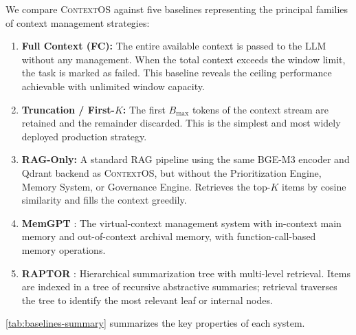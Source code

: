 \documentclass[review,12pt]{elsarticle}
\newcommand{\contextos}{\textsc{ContextOS}}
\begin{document}
We compare \contextos{} against five baselines representing the principal
families of context management strategies:

\begin{enumerate}[label=\textbf{B\arabic*.}, leftmargin=3em]
  \item \textbf{Full Context (FC):}  The entire available context is passed to
  the LLM without any management.  When the total context exceeds the window
  limit, the task is marked as failed.  This baseline reveals the ceiling
  performance achievable with unlimited window capacity.

  \item \textbf{Truncation / First-$K$:}  The first $B_{\max}$ tokens of the
  context stream are retained and the remainder discarded.  This is the
  simplest and most widely deployed production strategy.

  \item \textbf{RAG-Only:}  A standard RAG pipeline using the same BGE-M3
  encoder and Qdrant backend as \contextos{}, but without the Prioritization
  Engine, Memory System, or Governance Engine.  Retrieves the top-$K$ items
  by cosine similarity and fills the context greedily.

  \item \textbf{MemGPT} \citep{packer2023memgpt}:  The virtual-context
  management system with in-context main memory and out-of-context archival
  memory, with function-call-based memory operations.

  \item \textbf{RAPTOR} \citep{sarthi2024raptor}:  Hierarchical summarization
  tree with multi-level retrieval.  Items are indexed in a tree of recursive
  abstractive summaries; retrieval traverses the tree to identify the most
  relevant leaf or internal nodes.

\end{enumerate}

\cref{tab:baselines-summary} summarizes the key properties of each system.
\end{document}
